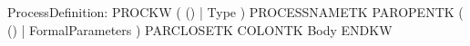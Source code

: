 %
%
%
\begin{rail}
ProcessDefinition: PROCKW ( () | Type ) PROCESSNAMETK PAROPENTK
                   ( () | FormalParameters ) PARCLOSETK COLONTK Body ENDKW
\end{rail}
